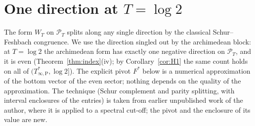 \documentclass[11pt]{amsart}
\theoremstyle{definition}
\theoremstyle{remark}
\newcommand{\PT}{\mathcal P_T}
\begin{document}
\section{One direction at $T=\log2$}\label{subsec:schur}

The form $W_T$ on $\PT$ splits along any single direction by the classical Schur--Feshbach
congruence. We use the direction singled out by the archimedean block: at $T=\log2$ the archimedean
form has exactly one negative direction on $\PT$, and it is even (Theorem~\ref{thm:index}(iv); by
Corollary~\ref{cor:H1} the same count holds on all of $(T^*_{\infty,\mathrm P},\log2]$). The explicit pivot
$F^*$ below is a numerical approximation of the bottom vector of the even sector; nothing depends on the
quality of the approximation. The technique (Schur complement and parity splitting, with interval
enclosures of the entries) is taken from earlier unpublished work of the author, where it is applied to
a spectral cut-off; the pivot and the enclosure of its value are new.
\end{document}
